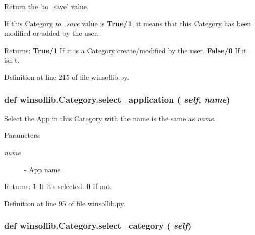 Return the 'to\_\-save' value. 

If this \hyperlink{classwinsollib_1_1Category}{Category} {\em to\_\-save\/} value is {\bf True/1}, it means that this \hyperlink{classwinsollib_1_1Category}{Category} has been modified or added by the user. \begin{Desc}
\item[Returns:]{\bf True/1} If it is a \hyperlink{classwinsollib_1_1Category}{Category} create/modified by the user. {\bf False/0} If it isn't. \end{Desc}


Definition at line 215 of file winsollib.py.\hypertarget{classwinsollib_1_1Category_eb09534a04cc27552a864432fe6804e2}{
\subsubsection[select\_\-application]{\setlength{\rightskip}{0pt plus 5cm}def winsollib.Category.select\_\-application ( {\em self},  {\em name})}}
\label{classwinsollib_1_1Category_eb09534a04cc27552a864432fe6804e2}


Select the \hyperlink{classwinsollib_1_1App}{App} in this \hyperlink{classwinsollib_1_1Category}{Category} with the name is the same as {\em name\/}. 

\begin{Desc}
\item[Parameters:]
\begin{description}
\item[{\em name}]- \hyperlink{classwinsollib_1_1App}{App} name \end{description}
\end{Desc}
\begin{Desc}
\item[Returns:]{\bf 1} If it's selected. {\bf 0} If not. \end{Desc}


Definition at line 95 of file winsollib.py.\hypertarget{classwinsollib_1_1Category_f230be763ff41f4c59b2c70ce1ef2fc0}{
\subsubsection[select\_\-category]{\setlength{\rightskip}{0pt plus 5cm}def winsollib.Category.select\_\-category ( {\em self})}}
\label{classwinsollib_1_1Category_f230be763ff41f4c59b2c70ce1ef2fc0}


